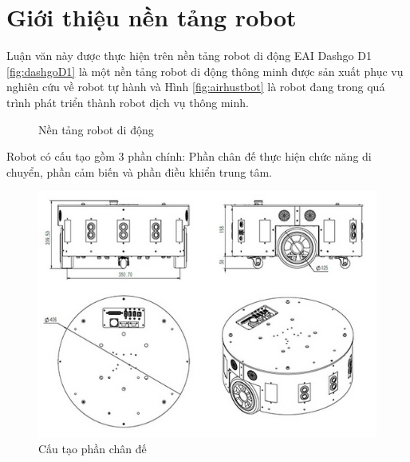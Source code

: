 \section{Giới thiệu nền tảng robot}
\label{sec:RobotIntro}

Luận văn này được thực hiện trên nền tảng robot di động EAI Dashgo D1 \figurename{ \ref{fig:dashgoD1}} là một nền tảng robot di động thông minh được sản xuất phục vụ nghiên cứu về robot tự hành và Hình \ref{fig:airhustbot} là robot đang trong quá trình phát triển thành robot dịch vụ thông minh.



\begin{figure}[htbp]
    \centering
    \caption{Nền tảng robot di động}
    \label{fig:platformRobto}
\end{figure}

Robot có cấu tạo gồm 3 phần chính: Phần chân đế thực hiện chức năng di chuyển, phần cảm biến và phần điều khiển trung tâm.

\begin{figure}[htbp]
	\centering
	\includegraphics[width=0.7\linewidth]{figures/dashgo_base.png}
	\caption{Cấu tạo phần chân đế}
	\label{fig:dashgoBase}
\end{figure}


